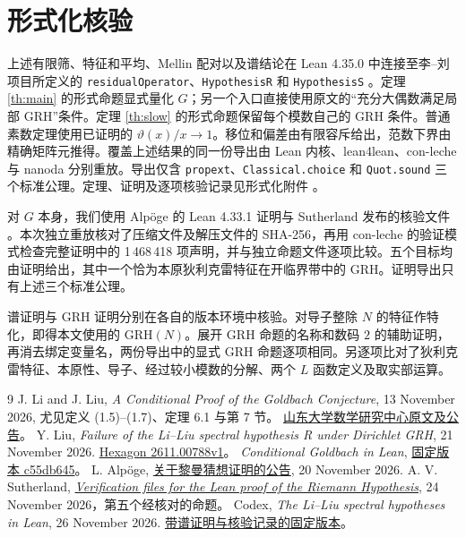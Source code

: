 \documentclass[UTF8,a4paper,11pt,fontset=fandol]{ctexart}
\newcommand{\GRH}{\mathrm{GRH}}
\begin{document}
\clearpage
\section*{形式化核验}
上述有限筛、特征和平均、Mellin 配对以及谱结论在 Lean 4.35.0 中连接至李--刘项目所定义的 \texttt{residualOperator}、\texttt{HypothesisR} 和 \texttt{HypothesisS} \cite{LLLean}。定理 \ref{th:main} 的形式命题显式量化 \(G\)；另一个入口直接使用原文的“充分大偶数满足局部 GRH”条件。定理 \ref{th:slow} 的形式命题保留每个模数自己的 GRH 条件。普通素数定理使用已证明的 \(\vartheta(x)/x\to1\)。移位和偏差由有限容斥给出，范数下界由精确矩阵元推得。覆盖上述结果的同一份导出由 Lean 内核、lean4lean、con-leche 与 nanoda 分别重放。导出仅含 \texttt{propext}、\texttt{Classical.choice} 和 \texttt{Quot.sound} 三个标准公理。定理、证明及逐项核验记录见形式化附件 \cite{ThisLean}。

对 \(G\) 本身，我们使用 Alpöge 的 Lean 4.33.1 证明与 Sutherland 发布的核验文件 \cite{GRH}。本次独立重放核对了压缩文件及解压文件的 SHA-256，再用 con-leche 的验证模式检查完整证明中的 1\,468\,418 项声明，并与独立命题文件逐项比较。五个目标均由证明给出，其中一个恰为本原狄利克雷特征在开临界带中的 GRH。证明导出只有上述三个标准公理。

谱证明与 GRH 证明分别在各自的版本环境中核验。对导子整除 \(N\) 的特征作特化，即得本文使用的 \(\GRH(N)\)。展开 GRH 命题的名称和数码 \(2\) 的辅助证明，再消去绑定变量名，两份导出中的显式 GRH 命题逐项相同。另逐项比对了狄利克雷特征、本原性、导子、经过较小模数的分解、两个 \(L\) 函数定义及取实部运算。

\begin{thebibliography}{9}
 J. Li and J. Liu, \textit{A Conditional Proof of the Goldbach Conjecture},
13 November 2026, 尤见定义 (1.5)--(1.7)、定理 6.1 与第 7 节。
\href{https://mrc.sdu.edu.cn/english/info/1018/1514.htm}{山东大学数学研究中心原文及公告}。
 Y. Liu, \textit{Failure of the Li--Liu spectral hypothesis R under Dirichlet GRH},
21 November 2026. \href{https://hexagonmath.org/2611.00788v1}{Hexagon 2611.00788v1}。
 \textit{Conditional Goldbach in Lean},
\href{https://github.com/subfish-zhou/conditional-goldbach-lean/tree/c55db645f3b4aed00374fe4aa1fcee2428c88c4b}{固定版本 c55db645}。
 L. Alpöge, \href{https://alpo.ge/remark.pdf}{关于黎曼猜想证明的公告}, 20 November 2026.
A. V. Sutherland, \href{https://math.mit.edu/~drew/grh/}{\textit{Verification files for the Lean proof of the Riemann Hypothesis}},
24 November 2026，第五个经核对的命题。
 Codex, \textit{The Li--Liu spectral hypotheses in Lean}, 26 November 2026.
\href{https://github.com/RaymondVoldemortFu/li-liu-spectral-hypotheses-lean/tree/eb458a4}{带谱证明与核验记录的固定版本}。
\end{thebibliography}
\end{document}
